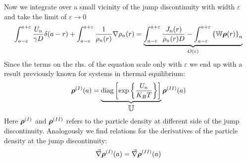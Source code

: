Now we integrate over a small vicinity of the jump discontinuity with width $\varepsilon$ and take the limit of $\varepsilon \rightarrow 0$
    \begin{equation}
        \int_{a-\varepsilon}^{a + \varepsilon} \frac{U_n}{\gamma D}\delta(a-r) + \int_{a-\varepsilon}^{a + \varepsilon} \frac{1}{\rho_n(r)}\nabla \rho_n(r) = \underbrace{\int_{a - \varepsilon}^{a + \varepsilon}\frac{J_n(r)}{\rho_n(r) D} - \int_{a - \varepsilon} ^{a+ \varepsilon} \left\{ \mathbb{W} \boldsymbol{\mathbf{\rho}}(r)\right\}_{n}}_\text{$O(\varepsilon)$}
    \end{equation}
Since the terms on the rhs. of the equation scale only with $\varepsilon$ we end up with a result previously known for systems in thermal equilibrium:
\begin{equation}
    \boldsymbol{\mathbf{\rho}}^{(I)}(a) = \underbrace{ {\rm diag}\left[\exp\left\{\frac{U_n}{K_B T} \right\}\right]}_\text{\large$\mathbb{U}$} \boldsymbol{\mathbf{\rho}}^{(II)}(a)
    \label{dens_fit}
\end{equation}
Here $\boldsymbol{\mathbf{\rho}}^{(I)}$ and $\boldsymbol{\mathbf{\rho}}^{(II)}$ refers to the particle density at different side of the jump discontinuity.
Analogously we find relations for the derivatives of the particle density at the jump discontinuity:
\begin{equation}
    \vec{\nabla}\boldsymbol{\mathbf{\rho}}^{(I)}(a) = \vec{\nabla}\boldsymbol{\mathbf{\rho}}^{(II)}(a)
    \label{ddens_fit}
\end{equation}
